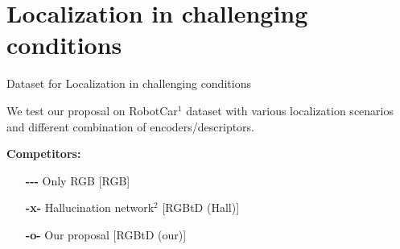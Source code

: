 \section{Localization in challenging conditions}

\label{sec:results}

\begin{frame}{Dataset for Localization in challenging conditions}
	
	\begin{minipage}[t]{0.6\linewidth}
		We test our proposal on RobotCar$^1$ dataset with various localization scenarios and different combination of encoders/descriptors.
		\vspace{1cm}
		
	\end{minipage}\hfill
	{
	\begin{minipage}[t]{0.32\linewidth}
		\textbf{Competitors:}
		\begin{itemize}
			\item[\textbf{-{}-{}-}] Only RGB [RGB]
			\item[\textbf{-x-}] Hallucination network$^2$ [RGBtD (Hall)]
			\item[\textbf{-o-}] Our proposal [RGBtD (our)]
		\end{itemize}
	\end{minipage}
	\textcolor{white}{}	
	}	
\end{frame}

